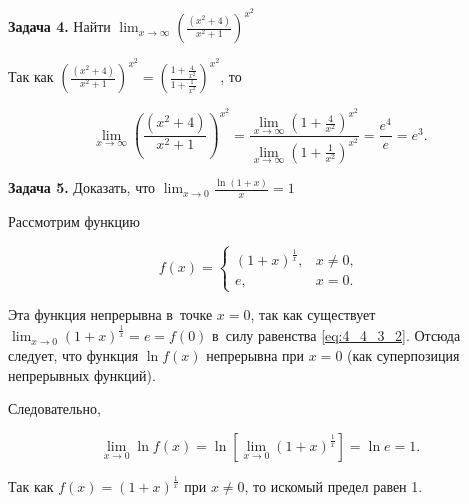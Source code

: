 \textbf{Задача 4.}\label{ex:4_4_3_4} Найти
$\displaystyle
\lim_{x \to \infty}
  \left(
    \frac{\left( x^{2} + 4 \right)}{x^{2} + 1}
  \right)^{x^{2}}$

Так как 
$\displaystyle
\left( \frac{\left( x^{2} + 4 \right)}{x^{2} + 1} \right)^{x^{2}} = 
\left( \frac{1 + \frac{4}{x^{2}}}{1 + \frac{1}{x^{2}}} \right)^{x^{2}}$,
то

\begin{equation*}
\displaystyle
\lim_{x \to \infty}
  \left(
    \frac{\left( x^{2} + 4 \right)}{x^{2} + 1}
  \right)^{x^{2}} = 
  \frac{
    \displaystyle \lim_{x \to \infty}\left( 1 + \frac{4}{x^{2}} \right)^{x^{2}}}{
    \displaystyle \lim_{x \to \infty}\left( 1 + \frac{1}{x^{2}} \right)^{x^{2}}
  } = \frac{e^{4}}{e} = e^{3}.
\end{equation*}

\textbf{Задача 5.}\label{ex:4_4_3_5} Доказать, что
$\displaystyle \lim_{x \to 0}\frac{\ln(1 + x)}{x} = 1$

Рассмотрим функцию

\begin{equation*}
\displaystyle f(x) = 
\begin{cases}
\left( 1 + x \right)^{\frac{1}{x}}, & x \ne 0, \\
e, & x = 0.
\end{cases}
\end{equation*}

Эта функция непрерывна в~точке $x = 0$, так как существует
$\displaystyle \lim_{x \to 0} (1 + x)^{\frac{1}{x}} = e = f(0)$
в~силу равенства \eqref{eq:4_4_3_2}.
Отсюда следует, что функция $\ln f(x)$ непрерывна при $x = 0$
(как суперпозиция непрерывных функций).

Следовательно, 

\begin{equation*}
\displaystyle
\lim_{x \to 0} \ln f(x) =
\ln
\left[ 
\lim_{x \to 0} \left( 1 + x \right)^{\frac{1}{x}}
\right] =
\ln e = 1.
\end{equation*}

\noindent
Так как $f(x) = (1 + x)^{\frac{1}{x}}$ при $x \ne 0$, то искомый предел равен 1.

